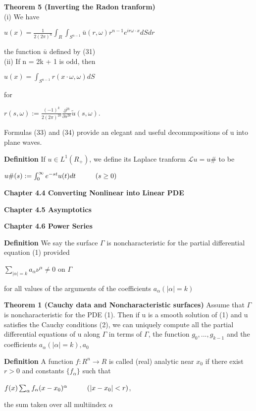 \documentclass{article}
\newcommand\tab[1][1cm]{\hspace*{#1}}
\begin{document}
\textbf {Theorem 5 (Inverting the Radon tranform)} \\ \tab (i) We have 
\begin{center}
$u(x) = \frac{1}{2(2\pi)^n} \int_R \int_{S^{n-1}} \bar{u}(r, \omega)r^{n-1} e^{ir\omega \cdot x} dSdr$
\end{center}
the function $\bar{u}$ defined by (31) \\
\tab (ii) If n = 2k + 1 is odd, then 
\begin{center}
$u(x) = \int_{S^{n-1}} r(x \cdot \omega, \omega) dS$
\end{center}
for 
\begin{center}
$r(s, \omega) := \frac{(-1)^k }{2(2\pi)^{2k}}\frac{\partial^{2k}}{\partial s^{2k}} \tilde{u}(s, \omega)$.
\end{center}
Formulas (33) and (34) provide an elegant and useful decommpositions of u into plane waves.

\textbf {Definition} If $u \in L^1(R_+)$, we define its Laplace tranform $\mathcal{L}u = u \#$ to be 
\begin{center}
$u \#(s) := \int_0^\infty e^{-st} u(t) dt \tab (s \geq 0)$
\end{center}

\textbf {Chapter 4.4 Converting Nonlinear into Linear PDE}

\textbf {Chapter 4.5 Asymptotics}

\textbf {Chapter 4.6 Power Series}

\textbf {Definition} We say the surface $\Gamma$ is noncharacteristic for the partial differential equation (1) provided
\begin{center}
$\sum_{|\alpha|=k} a_{\alpha}\nu^{\alpha} \neq 0$ \tab on $\Gamma$
\end{center}
for all values of the arguments of the coefficients $a_{\alpha} (|\alpha| = k )$

\textbf {Theorem 1 (Cauchy data and Noncharacteristic surfaces)} Assume that $\Gamma$ is noncharacteristic for the PDE (1). Then if u is a smooth solution of (1) and u satisfies the Cauchy conditions (2), we can uniquely compute all the partial differential equations of u along $\Gamma$ in terms of $\Gamma$, the function $g_0, ...,g_{k-1}$ and the coefficients $a_{\alpha} (|\alpha| = k), a_0$

\textbf {Definition} A function $f: R^n \to R$ is called (real) analytic near $x_0$ if there exist $r > 0$ and constants $\{f_{\alpha}\}$ such that 
\begin{center}
$f(x) \sum_{\alpha} f_{\alpha} (x-x_0)^{\alpha} \tab (|x-x_0| < r)$,
\end{center}
the sum taken over all multiindex $\alpha$
\end{document}

